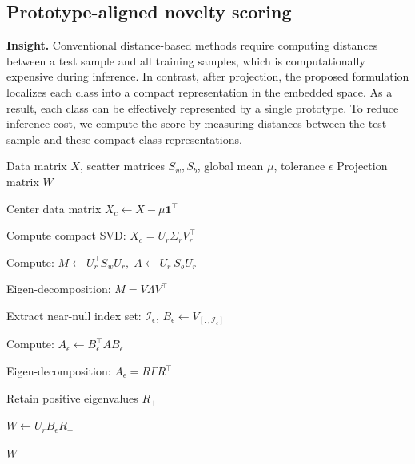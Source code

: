 \documentclass[final,twocolumn,10pt]{elsarticle}
\begin{document}
\subsection{Prototype-aligned novelty scoring}
\label{subsec:scoring_XXX}
\noindent \textbf{Insight.}
Conventional distance-based methods require computing distances between a test sample and all training samples, which is computationally expensive during inference. In contrast, after projection, the proposed formulation localizes each class into a compact representation in the embedded space. As a result, each class can be effectively represented by a single prototype. To reduce inference cost, we compute the score by measuring distances between the test sample and these compact class representations.
\begin{algorithm}[!htbp]
\caption{Spectral Relaxation NFST Solver}
\label{alg:nearnull_nfst}
\begin{algorithmic}
\REQUIRE Data matrix \(X\), scatter matrices \(S_w,S_b\), global mean \(\mu\), tolerance \(\epsilon\)
\ENSURE Projection matrix \(W\)

\STATE Center data matrix \(X_c \gets X-\mu\mathbf{1}^\top\)

\STATE Compute compact SVD: \(X_c = U_r \Sigma_r V_r^\top\)

\STATE Compute:
\(M \gets U_r^\top S_w U_r,\;
A \gets U_r^\top S_b U_r\)

\STATE Eigen-decomposition: \(M = V \Lambda V^\top\)

\STATE Extract near-null index set: $\mathcal{I}_\epsilon $, \(B_\epsilon \gets V_{[:,\mathcal{I}_\epsilon]}\)

\STATE Compute:
\(A_\epsilon \gets B_\epsilon^\top A B_\epsilon\)

\STATE Eigen-decomposition: \(A_\epsilon = R \Gamma R^\top\)

\STATE Retain positive eigenvalues \(R_+\)

\STATE \(W \gets U_r B_\epsilon R_+\)

\RETURN \(W\)

\end{algorithmic}
\end{algorithm}
\end{document}
